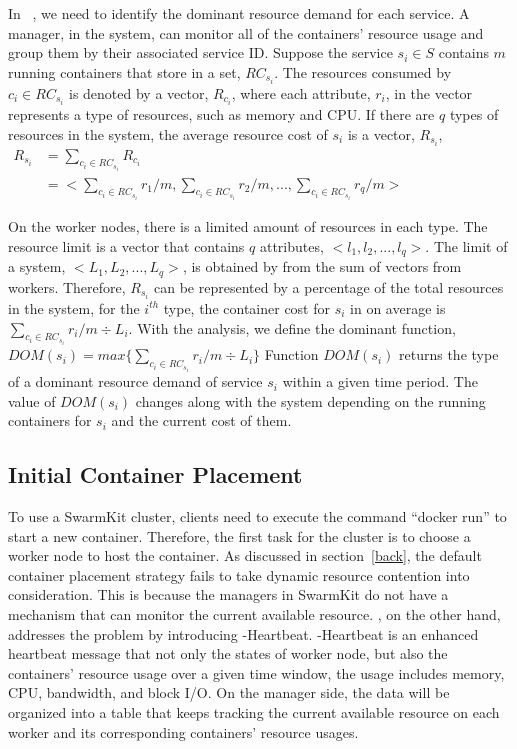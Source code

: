 In \sol~, we need to identify the dominant resource demand for each service.
A manager, in the system, can monitor all of the containers' resource usage and group them by their associated service ID.
Suppose the service $s_i \in S$ contains
$m$ running containers that store in a set, $RC_{s_i}$. The resources consumed by $c_i \in RC_{s_i}$ is denoted by a vector,
$R_{c_i}$, where each attribute, $r_i$, in the vector represents a type of resources, such as memory and CPU.
If there are $q$ types of resources in the system, the average resource cost of $s_i$ is a vector, $R_{s_i}$,
$\begin{aligned}
 R_{s_i} & = \sum\nolimits_{c_i \in RC_{s_i}} R_{c_i} \\
         & = <\sum_{c_i \in RC_{s_i}} r_1 / m, \sum_{c_i \in RC_{s_i}} r_2 / m, ..., \sum_{c_i \in RC_{s_i}} r_q / m>
 \end{aligned}
$

On the worker nodes, there is a limited amount of resources in each type.
The resource limit is a vector that contains $q$ attributes, $<l_1, l_2, ..., l_q>$.
The limit of a system, $<L_1, L_2, ..., L_q>$, is obtained by from the sum of vectors from workers.
Therefore,  $R_{s_i}$ can be represented by a percentage of the total resources in the system, for the
$i^{th}$ type, the container cost for $s_i$ in on average is $\sum_{c_i \in RC_{s_i}} r_i / m \div L_i$.
With the analysis, we define the dominant function,
$
  DOM(s_i) = max \{ \sum_{c_i \in RC_{s_i}} r_i / m \div L_i \}
$
Function $DOM(s_i)$ returns the type of a dominant resource demand of service $s_i$ within a given time period.
The value of $DOM(s_i)$ changes along with the
system depending on the running containers for $s_i$ and the current cost of them.


\subsection{Initial Container Placement}
To use a SwarmKit cluster, clients need to execute the command ``docker run'' to start a new container.
Therefore, the first task for the cluster is to choose a worker node to host the container.
As discussed in section~\ref{back}, the default container placement strategy fails to take dynamic
resource contention into consideration. This is because the managers in SwarmKit
do not have a mechanism that can monitor the current available resource.
\sol, on the other hand, addresses the problem by introducing \sol-Heartbeat.
\sol-Heartbeat is an enhanced heartbeat message that not only the states of worker node, but also the
containers' resource usage over a given time window, the usage includes memory, CPU, bandwidth, and block I/O.
On the manager side, the data will be organized into a table that keeps tracking the current available resource
on each worker and its corresponding containers' resource usages.

